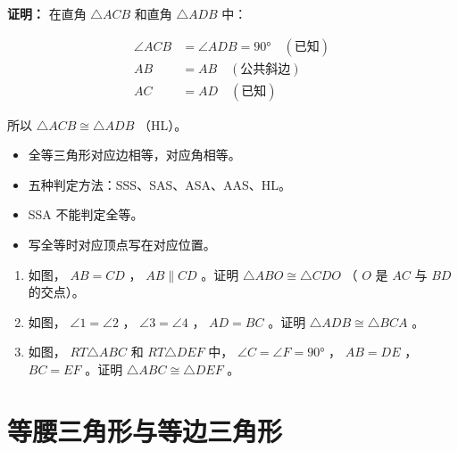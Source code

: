 \begin{workedexamples}
\begin{center}
\label{fig:congruent-ex3}
\end{center}


\textbf{证明：}
在直角 $\triangle ACB$ 和直角 $\triangle ADB$ 中：

$$\begin{aligned}
\angle ACB &= \angle ADB = 90° \quad (\text{已知}) \\
AB &= AB \quad (\text{公共斜边}) \\
AC &= AD \quad (\text{已知})
\end{aligned}$$

所以 $\triangle ACB \cong \triangle ADB$ （HL）。

\end{workedexamples}

\begin{keytakeaway}


\begin{itemize}
  \item 全等三角形对应边相等，对应角相等。
  \item 五种判定方法：SSS、SAS、ASA、AAS、HL。
  \item SSA 不能判定全等。
  \item 写全等时对应顶点写在对应位置。
\end{itemize}


\end{keytakeaway}

\begin{practice}


\begin{enumerate}
  \item 如图， $AB = CD$ ， $AB \parallel CD$ 。证明 $\triangle ABO \cong \triangle CDO$ （ $O$ 是 $AC$ 与 $BD$ 的交点）。
  \item 如图， $\angle 1 = \angle 2$ ， $\angle 3 = \angle 4$ ， $AD = BC$ 。证明 $\triangle ADB \cong \triangle BCA$ 。
  \item 如图， $RT\triangle ABC$ 和 $RT\triangle DEF$ 中， $\angle C = \angle F = 90°$ ， $AB = DE$ ， $BC = EF$ 。证明 $\triangle ABC \cong \triangle DEF$ 。
\end{enumerate}


\end{practice}



\section*{等腰三角形与等边三角形}


